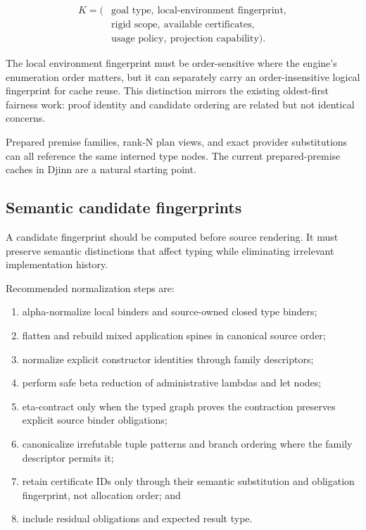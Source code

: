 \documentclass[11pt]{article}
\newcommand{\Djinn}{Djinn}
\begin{document}
\[
\begin{aligned}
K = (&\text{goal type},\ \text{local-environment fingerprint},\\
     &\text{rigid scope},\ \text{available certificates},\\
     &\text{usage policy},\ \text{projection capability}).
\end{aligned}
\]

The local environment fingerprint must be order-sensitive where the engine's
enumeration order matters, but it can separately carry an order-insensitive
logical fingerprint for cache reuse.  This distinction mirrors the existing
oldest-first fairness work: proof identity and candidate ordering are related
but not identical concerns.

Prepared premise families, rank-N plan views, and exact provider substitutions
can all reference the same interned type nodes.  The current prepared-premise
caches in \Djinn{} are a natural starting point.

\subsection{Semantic candidate fingerprints}

A candidate fingerprint should be computed before source rendering.  It must
preserve semantic distinctions that affect typing while eliminating irrelevant
implementation history.

Recommended normalization steps are:

\begin{enumerate}
  \item alpha-normalize local binders and source-owned closed type binders;
  \item flatten and rebuild mixed application spines in canonical source order;
  \item normalize explicit constructor identities through family descriptors;
  \item perform safe beta reduction of administrative lambdas and let nodes;
  \item eta-contract only when the typed graph proves the contraction preserves
    explicit source binder obligations;
  \item canonicalize irrefutable tuple patterns and branch ordering where the
    family descriptor permits it;
  \item retain certificate IDs only through their semantic substitution and
    obligation fingerprint, not allocation order; and
  \item include residual obligations and expected result type.
\end{enumerate}
\end{document}
